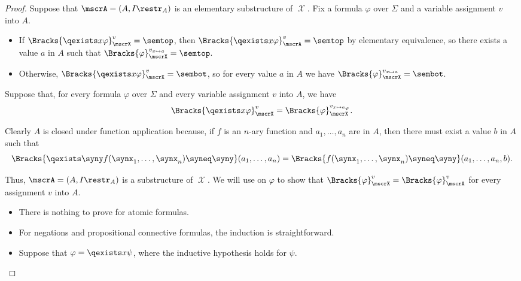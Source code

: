 \begin{proof}
  \SufficiencySubProof Suppose that \( \mscrA = (A, I\restr_A) \) is an elementary substructure of \( \mscrX \). Fix a formula \( \varphi \) over \( \Sigma \) and a variable assignment \( v \) into \( A \).
  \begin{itemize}
    \item If \( \Bracks{\qexists x \varphi}_\mscrX^v = \semtop \), then \( \Bracks{\qexists x \varphi}_\mscrA^v = \semtop \) by elementary equivalence, so there exists a value \( a \) in \( A \) such that \( \Bracks{\varphi}_\mscrX^{v_{x \mapsto a}} = \semtop \).

    \item Otherwise, \( \Bracks{\qexists x \varphi}_\mscrX^v = \sembot \), so for every value \( a \) in \( A \) we have \( \Bracks{\varphi}_\mscrX^{v_{x \mapsto a}} = \sembot \).
  \end{itemize}

  \NecessitySubProof Suppose that, for every formula \( \varphi \) over \( \Sigma \) and every variable assignment \( v \) into \( A \), we have
  \begin{equation*}
    \Bracks{\qexists x \varphi}_\mscrX^v = \Bracks{\varphi}_\mscrX^{v_{x \mapsto a_\varphi}}.
  \end{equation*}

  Clearly \( A \) is closed under function application because, if \( f \) is an \( n \)-ary function and \( a_1, \ldots, a_n \) are in \( A \), then there must exist a value \( b \) in \( A \) such that
  \begin{equation*}
    \Bracks{\qexists \syny f(\synx_1, \ldots, \synx_n) \syneq \syny}(a_1, \ldots, a_n) = \Bracks{f(\synx_1, \ldots, \synx_n) \syneq \syny}(a_1, \ldots, a_n, b).
  \end{equation*}

  Thus, \( \mscrA = (A, I\restr_A) \) is a substructure of \( \mscrX \). We will use  on \( \varphi \) to show that \( \Bracks{\varphi}_\mscrX^v = \Bracks{\varphi}_\mscrA^v \) for every assignment \( v \) into \( A \).
  \begin{itemize}
    \item There is nothing to prove for atomic formulas.
    \item For negations and propositional connective formulas, the induction is straightforward.
    \item Suppose that \( \varphi = \qexists x \psi \), where the inductive hypothesis holds for \( \psi \).


\end{itemize}
\end{proof}
